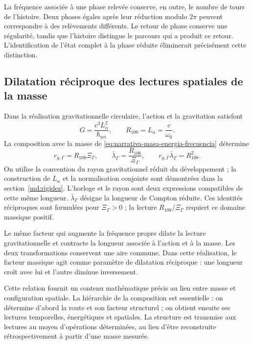 La fréquence associée à une phase relevée conserve, en outre, le nombre de
tours de l’histoire. Deux phases égales après leur réduction modulo
$2\pi$ peuvent correspondre à des relèvements différents. Le retour de phase
conserve une régularité, tandis que l’histoire distingue le parcours qui
a produit ce retour. L’identification de l’état complet à la phase
réduite éliminerait précisément cette distinction.

\subsection{Dilatation réciproque des lectures spatiales de la masse}
\label{subsec:narrativa-reciprocidad-espacial}

Dans la réalisation gravitationnelle circulaire, l’action et la gravitation
satisfont
\begin{equation}
 G=\frac{c^3L_\alpha^2}{\hbar_{\mathrm{ret}}},
 \qquad R_{108}=L_\alpha=\frac{c}{\omega_0}.
 \label{eq:narrativa-gravedad-accion}
\end{equation}
La composition avec la masse de
\eqref{eq:narrativa-masa-energia-frecuencia} détermine
\begin{equation}
 \boxed{
 r_{g,\Gamma}=R_{108}\Xi_\Gamma,
 \qquad
 \bar\lambda_\Gamma=\frac{R_{108}}{\Xi_\Gamma},
 \qquad
 r_{g,\Gamma}\bar\lambda_\Gamma=R_{108}^{2}.}
 \label{eq:narrativa-longitudes-reciprocas}
\end{equation}
On utilise la convention du rayon gravitationnel réduit du développement ;
la construction de $L_\alpha$ et la normalisation conjointe sont
démontrées dans la section~\ref{md:rigidez}. L’horloge et le rayon sont
deux expressions compatibles de cette même longueur.
$\bar\lambda_\Gamma$ désigne la longueur de Compton réduite. Ces
identités réciproques sont formulées pour $\Xi_\Gamma>0$ ; la lecture
$R_{108}/\Xi_\Gamma$ requiert ce domaine massique positif.

Le même facteur qui augmente la fréquence propre dilate la lecture
gravitationnelle et contracte la longueur associée à l’action et à la masse. Les deux
transformations conservent une aire commune. Dans cette réalisation, le facteur
massique agit comme paramètre de dilatation réciproque : une longueur croît avec
lui et l’autre diminue inversement.

Cette relation fournit un contenu mathématique précis au lien
entre masse et configuration spatiale. La hiérarchie de la composition est
essentielle : on détermine d’abord la route et son facteur structurel ; on obtient
ensuite ses lectures temporelles, énergétiques et spatiales. La structure
est transmise aux lectures au moyen d’opérations déterminées, au lieu
d’être reconstruite rétrospectivement à partir d’une masse mesurée.


